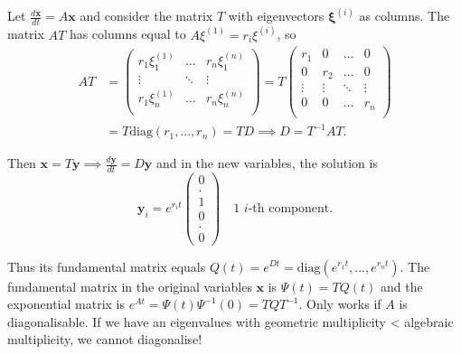 \documentclass[10pt,landscape]{article}
\begin{document}
\begin{multicols}{3}
Let $\frac{d\mathbf{x}}{dt} = A\mathbf{x}$ and consider the matrix $T$ with eigenvectors $\boldsymbol{\xi}^{(i)}$ as columns. The matrix $AT$ has columns equal to $A\xi^{(1)} = r_i\xi^{(i)}$, so 
  \begin{align*}
  AT &= \begin{pmatrix} 
       r_1 \xi_1^{(1)}    & \dots &  r_n\xi_1^{(n)}   \\
      \vdots   & \ddots   &  \vdots \\
      r_1 \xi_n^{(1)}    & \dots & r_n \xi_n^{(n)}  \\
  \end{pmatrix} 
  = T \begin{pmatrix} 
        r_1  & 0& \dots &  0 \\
      	0 &  r_2 & \dots    & 0 \\
     	\vdots & \vdots & \ddots & \vdots \\
     	0 & 0 & \dots &r_n \\
  	\end{pmatrix} \\ &= T \text{diag}(r_1,...,r_n) = TD \implies D = T^{-1}AT .
  \end{align*}
  
Then $\mathbf{x} = T\mathbf{y} \implies \frac{d\mathbf{y}}{dt} = D\mathbf{y}$ and in the new variables, the solution is 
\vspace{-0.35cm}
$$\mathbf{y}_i = e^{r_it} \begin{pmatrix} 0 \\  . \\ 1 \\ 0 \\ . \\0 \end{pmatrix} \quad \text{1 $i$-th component.}$$

Thus its fundamental matrix equals $Q(t) = e^{Dt} = \text{diag}(e^{r_1t},...,e^{r_nt})$. 
The fundamental matrix in the original variables $\mathbf{x}$ is $\Psi(t) = TQ(t)$ and the exponential matrix is $e^{At} = \Psi(t)\Psi^{-1}(0) = TQT^{-1}$. Only works if $A$ is diagonalisable. If we have an eigenvalues with geometric multiplicity < algebraic multiplicity, we cannot diagonalise!


\end{multicols}
\end{document}
